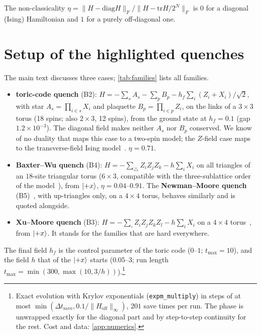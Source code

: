 \documentclass[11pt,a4paper]{article}
\newcommand{\BW}{\textcolor{cBW}{\textbf{Baxter--Wu quench}}}
\newcommand{\NM}{\textcolor{cNM}{\textbf{Newman--Moore quench}}}
\newcommand{\TC}{\textcolor{cTC}{\textbf{toric-code quench}}}
\newcommand{\XM}{\textcolor{cXM}{\textbf{Xu--Moore quench}}}
\begin{document}
The non-classicality $\eta=\lVert H-\mathrm{diag}H\rVert_F/\lVert H-\mathrm{tr}H/2^N\rVert_F$ is $0$ for a diagonal
(Ising) Hamiltonian and $1$ for a purely off-diagonal one.

\section{Setup of the highlighted quenches}
\label{sec:setup}
The main text discusses three cases; \cref{tab:families} lists all families.
\begin{itemize}
  \item \TC{} (B2): $H=-\sum_sA_s-\sum_pB_p-h_f\sum_i(Z_i+X_i)/\sqrt2$, with star $A_s=\prod_{i\in s}X_i$ and plaquette
    $B_p=\prod_{i\in p}Z_i$, on the links of a $3\times3$ torus (18 spins; also $2\times3$, 12 spins), from the ground
    state at $h_f=0.1$ (gap $1.2\times10^{-3}$). The diagonal field makes neither $A_s$ nor $B_p$ conserved. We know of
    no duality that maps this case to a two-spin model; the $Z$-field case maps to the transverse-field Ising
    model~\cite{Wegner71,Trebst07}. $\eta=0.71$.
  \item \BW{} (B4): $H=-\sum_\triangle Z_iZ_jZ_k-h\sum_iX_i$ on all triangles of an $18$-site triangular torus
    ($6\times3$, compatible with the three-sublattice order of the model~\cite{BaxterWu73}), from $\ket{+x}$, $\eta=0.04$--$0.91$.
    The \NM{} (B5)~\cite{NewmanMoore99}, with up-triangles only, on a $4\times4$ torus, behaves similarly and is
    quoted alongside.
  \item \XM{} (B3): $H=-\sum_\square Z_iZ_jZ_kZ_l-h\sum_iX_i$ on a $4\times4$ torus~\cite{XuMoore04}, from $\ket{+x}$.
    It stands for the families that are hard everywhere.
\end{itemize}
The final field $h_f$ is the control parameter of the toric code ($0$--$1$; $t_{\max}=10$), and the field $h$ that of
the $\ket{+x}$ starts ($0.05$--$3$; run length $t_{\max}=\min(300,\max(10,3/h))$).\footnote{Exact evolution
with Krylov exponentials (\texttt{expm\_multiply}) in steps of at most $\min(\Delta t_{\mathrm{save}},0.1/\lVert
H_{\mathrm{off}}\rVert_{\infty})$, $201$ save times per run. The phase is unwrapped exactly for the diagonal part and by
step-to-step continuity for the rest. Cost and data: \cref{app:numerics}.}
\end{document}
